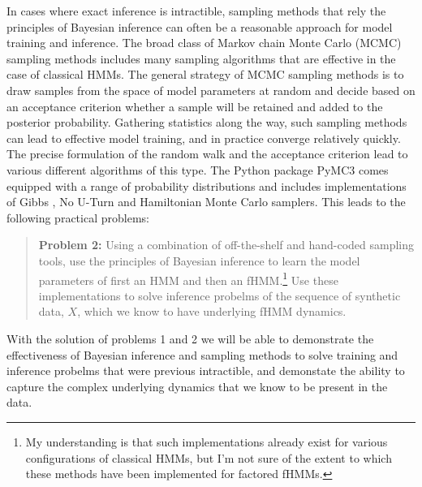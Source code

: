 \documentclass{article}
\begin{document}
In cases where exact inference is intractible, sampling methods that rely the principles of Bayesian inference can often be a reasonable approach for model training and inference.  The broad class of Markov chain Monte Carlo (MCMC) sampling methods includes many sampling algorithms that are effective in the case of classical HMMs. The general strategy of MCMC sampling methods is to draw samples from the space of model parameters at random and decide based on an acceptance criterion whether a sample will be retained and added to the posterior probability.  Gathering statistics along the way, such sampling methods can lead to effective model training, and in practice converge relatively quickly.  The precise formulation of the random walk and the acceptance criterion lead to various different algorithms of this type.  The Python package PyMC3 \cite{SWF16} comes equipped with a range of probability distributions and includes implementations of Gibbs \cite{CG92}, No U-Turn \cite{HG14} and Hamiltonian Monte Carlo \cite{DKPR87} samplers.  This leads to the following practical problems:

\begin{quote}
\textbf{Problem 2:} Using a combination of off-the-shelf and hand-coded sampling tools, use the principles of Bayesian inference to learn the model parameters of first an HMM and then an fHMM.\footnote{My understanding is that such implementations already exist for various configurations of classical HMMs, but I'm not sure of the extent to which these methods have been implemented for factored fHMMs.}  Use these implementations to solve inference probelms of the sequence of synthetic data, $X$, which we know to have underlying fHMM dynamics.
\end{quote}  
With the solution of problems 1 and 2 we will be able to demonstrate the effectiveness of Bayesian inference and sampling methods to solve training and inference probelms that were previous intractible, and demonstate the ability to capture the complex underlying dynamics that we know to be present in the data.
\end{document}

